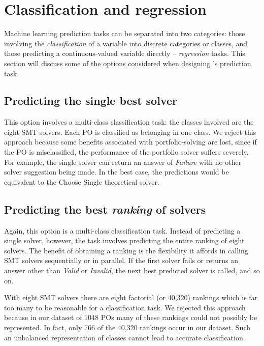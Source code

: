 \section{Classification and regression}
\label{sec:reg-class}

Machine learning prediction tasks can be separated into two categories: those involving the \textit{classification} of a variable into discrete categories or classes, and those predicting a continuous-valued variable directly -- \textit{regression} tasks.
This section will discuss some of the options considered when designing \where's prediction task.

\subsection{Predicting the single best solver} This option involves a multi-class classification task: the classes involved are the eight SMT solvers.
Each PO is classified as belonging in one class. 
We reject this approach because some benefits associated with portfolio-solving are lost, since if the PO is misclassified, the performance of the portfolio solver suffers severely.
For example, the single solver can return an answer of \textit{Failure} with no other solver suggestion being made.
In the best case, the predictions would be equivalent to the \textsf{Choose Single} theoretical solver.

\subsection{Predicting the best \textit{ranking} of solvers} Again, this option is a multi-class classification task. 
Instead of predicting a single solver, however, the task involves predicting the entire ranking of eight solvers. 
The benefit of obtaining a ranking is the flexibility it affords in calling SMT solvers sequentially or in parallel.
If the first solver fails or returns an answer other than \textit{Valid} or \textit{Invalid}, the next best predicted solver is called, and so on.

With eight SMT solvers there are eight factorial (or 40,320) rankings which is far too many to be reasonable for a classification task. 
We rejected this approach because in our dataset of 1048 POs many of these rankings could not possibly be represented.
In fact, only 766 of the 40,320 rankings occur in our dataset.  
Such an unbalanced representation of classes cannot lead to accurate classification.
